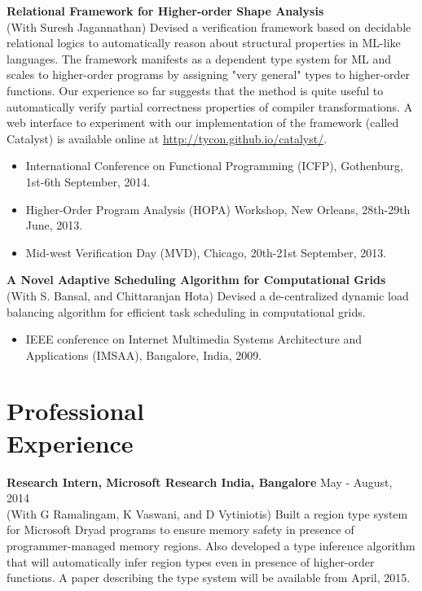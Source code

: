\documentclass[margin,line]{res}
\begin{document}
\begin{resume}
 {\bf Relational Framework for Higher-order Shape Analysis} \\
 (With Suresh Jagannathan) Devised a verification framework based on
 decidable relational logics to automatically reason about structural
 properties in ML-like languages. The framework manifests as a
 dependent type system for ML and scales to higher-order programs by
 assigning "very general" types to higher-order functions. Our
 experience so far suggests that the method is quite useful to
 automatically verify partial correctness properties of compiler
 transformations. A web interface to experiment with our
 implementation of the framework (called {\sc Catalyst}) is available
 online at \url{http://tycon.github.io/catalyst/}.
 \begin{itemize} \itemsep -2pt  %
 \item International Conference on Functional Programming (ICFP),
 Gothenburg, 1st-6th September, 2014.
 \item Higher-Order Program Analysis (HOPA) Workshop, New Orleans,
 28th-29th June, 2013.
 \item Mid-west Verification Day (MVD), Chicago, 20th-21st September,
 2013.
 \end{itemize}

{\bf A Novel Adaptive Scheduling Algorithm for Computational Grids}\\
(With S. Bansal, and Chittaranjan Hota) Devised a de-centralized
dynamic load balancing algorithm for efficient task scheduling in
computational grids.
 \begin{itemize} \itemsep -2pt  %
 \item IEEE conference on Internet Multimedia Systems Architecture and
 Applications (IMSAA), Bangalore, India, 2009.
 \end{itemize}

\section{Professional \\ Experience}

{\bf Research Intern, Microsoft Research India, Bangalore} \hfill May - August, 2014\\
(With G Ramalingam, K Vaswani, and D Vytiniotis) Built a region type
system for Microsoft Dryad programs to ensure memory safety in
presence of programmer-managed memory regions. Also developed a type
inference algorithm that will automatically infer region types even in
presence of higher-order functions. A paper describing the type system
will be available from April, 2015.


\end{resume}
\end{document}
